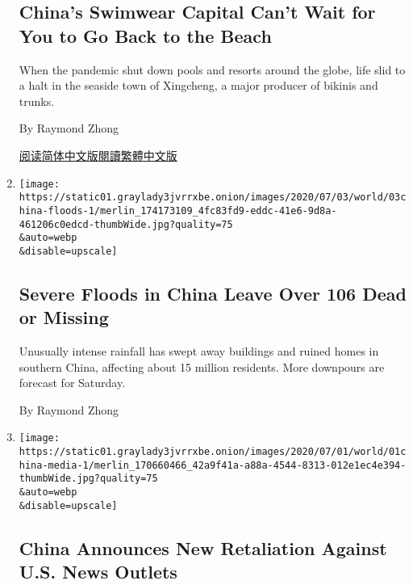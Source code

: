 \begin{enumerate}
  \hypertarget{chinas-swimwear-capital-cant-wait-for-you-to-go-back-to-the-beach}{%
  \subsection{China's Swimwear Capital Can't Wait for You to Go Back to
  the
  Beach}\label{chinas-swimwear-capital-cant-wait-for-you-to-go-back-to-the-beach}}

  When the pandemic shut down pools and resorts around the globe, life
  slid to a halt in the seaside town of Xingcheng, a major producer of
  bikinis and trunks.

  By Raymond Zhong

  \href{https://cn.nytimes3xbfgragh.onion/business/20200720/china-coronavirus-swimsuits/}{阅读简体中文版}\href{https://cn.nytimes3xbfgragh.onion/business/20200720/china-coronavirus-swimsuits/zh-hant/}{閱讀繁體中文版}
\item
  \href{/2020/07/03/world/asia/china-floods-rain.html}{}

  \texttt{[image: https://static01.graylady3jvrrxbe.onion/images/2020/07/03/world/03china-floods-1/merlin\_174173109\_4fc83fd9-eddc-41e6-9d8a-461206c0edcd-thumbWide.jpg?quality=75\\\&auto=webp\\\&disable=upscale]}

  \hypertarget{severe-floods-in-china-leave-over-106-dead-or-missing}{%
  \subsection{Severe Floods in China Leave Over 106 Dead or
  Missing}\label{severe-floods-in-china-leave-over-106-dead-or-missing}}

  Unusually intense rainfall has swept away buildings and ruined homes
  in southern China, affecting about 15 million residents. More
  downpours are forecast for Saturday.

  By Raymond Zhong
\item
  \href{/2020/07/01/business/media/china-journalists-crackdown.html}{}

  \texttt{[image: https://static01.graylady3jvrrxbe.onion/images/2020/07/01/world/01china-media-1/merlin\_170660466\_42a9f41a-a88a-4544-8313-012e1ec4e394-thumbWide.jpg?quality=75\\\&auto=webp\\\&disable=upscale]}

  \hypertarget{china-announces-new-retaliation-against-us-news-outlets}{%
  \subsection{China Announces New Retaliation Against U.S. News
  Outlets}\label{china-announces-new-retaliation-against-us-news-outlets}}


\end{enumerate}
